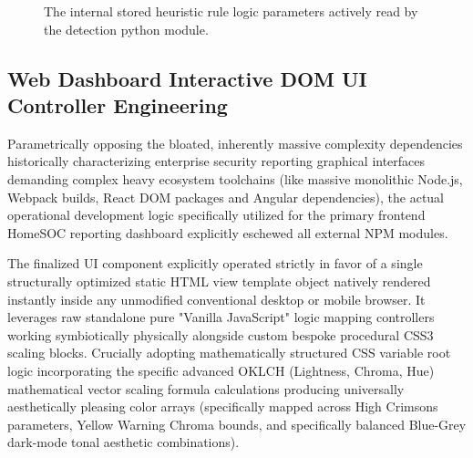 \begin{figure}[h]
    \centering
    \caption{The internal stored heuristic rule logic parameters actively read by the detection python module.}
    \label{fig:db_rules}
\end{figure}

\subsection{Web Dashboard Interactive DOM UI Controller Engineering}
Parametrically opposing the bloated, inherently massive complexity dependencies historically characterizing enterprise security reporting graphical interfaces demanding complex heavy ecosystem toolchains (like massive monolithic Node.js, Webpack builds, React DOM packages and Angular dependencies), the actual operational development logic specifically utilized for the primary frontend HomeSOC reporting dashboard explicitly eschewed all external NPM modules. 

The finalized UI component explicitly operated strictly in favor of a single structurally optimized static HTML view template object natively rendered instantly inside any unmodified conventional desktop or mobile browser. It leverages raw standalone pure "Vanilla JavaScript" logic mapping controllers working symbiotically physically alongside custom bespoke procedural CSS3 scaling blocks. Crucially adopting mathematically structured CSS variable root logic incorporating the specific advanced OKLCH (Lightness, Chroma, Hue) mathematical vector scaling formula calculations producing universally aesthetically pleasing color arrays (specifically mapped across High Crimsons parameters, Yellow Warning Chroma bounds, and specifically balanced Blue-Grey dark-mode tonal aesthetic combinations). 

